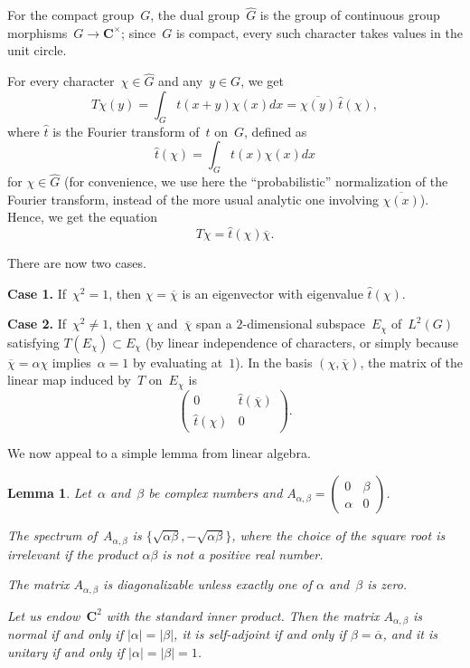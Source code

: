 \documentclass[12pt]{amsart}
\numberwithin{equation}{section}
\newcommand{\Cc}{\mathbf{C}}
\theoremstyle{plain}
\newtheorem{lemma}[theorem]{Lemma}
\theoremstyle{remark}
\theoremstyle{definition}
\begin{document}
For the compact group~$G$, the dual group~$\widehat{G}$ is the group of
continuous group morphisms~$G\to\Cc^{\times}$; since~$G$ is compact,
every such character takes values in the unit circle.

For every character~$\chi\in\widehat{G}$ and any~$y\in G$, we get
\[
  T\chi(y)=\int_G t(x+y)\chi(x)dx=\overline{\chi(y)}\,\widehat{t}(\chi), 
\]
where $\widehat{t}$ is the Fourier transform of~$t$ on~$G$, defined as
\[
  \widehat{t}(\chi)=\int_G t(x)\chi(x)dx
\]
for $\chi\in\widehat{G}$ (for convenience, we use here the
``probabilistic'' normalization of the Fourier transform,  instead of the more usual analytic one involving
$\overline{\chi(x)}$). Hence, we get the equation
\[
  T\chi=\widehat{t}(\chi)\overline{\chi}.
\]

There are now two cases.
\par
\medskip
\par
\textbf{Case 1.} If~$\chi^2=1$, then $\chi=\overline{\chi}$ is an eigenvector with
eigenvalue $\widehat{t}(\chi)$.

\par
\medskip
\par
\textbf{Case 2.} If~$\chi^2\not=1$, then $\chi$
and~$\overline{\chi}$ span a $2$-dimensional subspace~$E_{\chi}$ of~$L^2(G)$ satisfying \hbox{$T(E_{\chi})\subset E_{\chi}$} (by linear
  independence of characters, or simply because $\overline{\chi}=\alpha\chi$
  implies~$\alpha=1$ by evaluating at~$1$). In
the basis $(\chi,\overline{\chi})$, the matrix of the linear map induced
by~$T$ on~$E_{\chi}$ is
\[
  \begin{pmatrix}
    0&\widehat{t}(\overline{\chi})\\
    \widehat{t}(\chi)&0
  \end{pmatrix}.
\]

We now appeal to a simple lemma from linear algebra.

\begin{lemma}
  Let~$\alpha$ and~$\beta$ be complex numbers and
  $A_{\alpha,\beta}= \begin{pmatrix}
    0&\beta\\
    \alpha&0
  \end{pmatrix}$.
  
  \begin{enumth}
  \item The spectrum of~$A_{\alpha,\beta}$ is
    $\{\sqrt{\alpha\beta},-\sqrt{\alpha\beta}\}$, where the choice of
    the square root is irrelevant if the product $\alpha \beta$ is not a positive real
    number.
    
  \item The matrix $A_{\alpha,\beta}$ is diagonalizable unless exactly
    one of $\alpha$ and~$\beta$ is zero.

  \item Let us endow~$\Cc^2$ with the standard inner product. Then the matrix
    $A_{\alpha,\beta}$ is normal if and only if $|\alpha|=|\beta|$, it
    is self-adjoint if and only if $\beta=\overline{\alpha}$, and it is
    unitary if and only if $|\alpha|=|\beta|=1$.
  \end{enumth}
\end{lemma}
\end{document}
